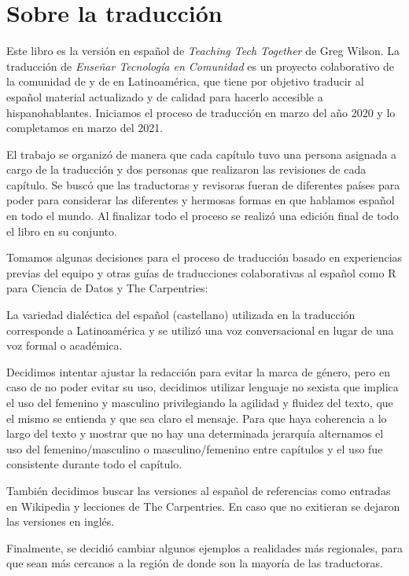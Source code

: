 \chapter*{Sobre la traducción}

Este libro es la versión en español de \emph{Teaching Tech Together} de Greg Wilson.
La traducción de \emph{Enseñar Tecnología en Comunidad} es un proyecto colaborativo
de la comunidad de 
y de  en Latinoamérica,
que tiene por objetivo traducir al español material actualizado y de calidad para hacerlo accesible a hispanohablantes.
Iniciamos el proceso de traducción en marzo del año 2020 y lo completamos en marzo del 2021.

El trabajo se organizó de manera que cada capítulo tuvo una persona asignada a cargo de la traducción 
y dos personas que realizaron las revisiones de cada capítulo.  
Se buscó que las traductoras y revisoras fueran de diferentes países para poder para considerar las 
diferentes y hermosas formas en que hablamos español en todo el mundo.
Al finalizar todo el proceso se realizó una edición final de todo el libro en su conjunto.

Tomamos algunas decisiones para el proceso de traducción basado en experiencias previas
del equipo y otras guías de traducciones colaborativas al español como {R para Ciencia de Datos}{}
y {The Carpentries}{}:

La variedad dialéctica del español (castellano) utilizada en la traducción corresponde 
a Latinoamérica y se utilizó una voz conversacional en lugar de una voz formal o académica.

Decidimos intentar ajustar la redacción para evitar la marca de género, pero
en caso de no poder evitar su uso, decidimos utilizar lenguaje no sexista  
que implica el uso del femenino y masculino privilegiando la agilidad y fluidez del texto, 
que el mismo se entienda y que sea claro el mensaje. Para que haya coherencia 
a lo largo del texto y mostrar que no hay una determinada jerarquía 
alternamos el uso del femenino/masculino o masculino/femenino entre capítulos 
y el uso fue consistente durante todo el capítulo. 

También decidimos buscar las versiones al español de referencias como 
entradas en Wikipedia y lecciones de The Carpentries.  En caso que no exitieran 
se dejaron las versiones en inglés.

Finalmente, se decidió cambiar algunos ejemplos a realidades más regionales, 
para que sean más cercanos a la región de donde son la mayoría de las
traductoras.

